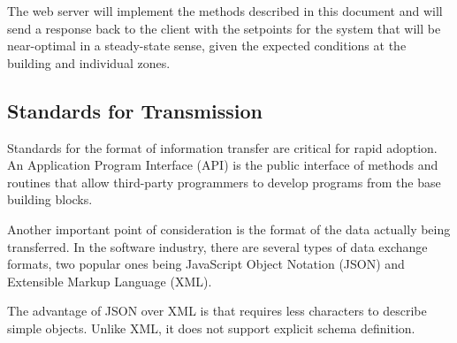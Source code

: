 The web server will implement the methods described in this document and
will send a response back to the client with the setpoints for the
system that will be near-optimal in a steady-state sense, given the
expected conditions at the building and individual zones. 

\subsection{Standards for Transmission}

Standards for the format of information transfer are critical for rapid
adoption. An Application  Program Interface (API) is the public
interface of methods and routines that allow third-party programmers to
develop programs from the base building blocks. 

Another important point of consideration is the format of the data
actually being transferred. In the software industry, there are several
types of data exchange formats, two popular ones being JavaScript Object
Notation (JSON) and Extensible Markup Language (XML). 

The advantage of JSON over XML is that requires less characters to
describe simple objects. Unlike XML, it does not support explicit schema
definition. 

